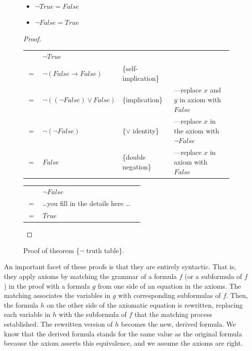\begin{figure}
\begin{theorem}
\mbox{}\\
\begin{itemize}
\item $\neg True = False$
\item $\neg False = True$
\end{itemize}
\end{theorem}
\begin{proof}
\mbox{} \\
\begin{tabular}{llll}
    & $\neg True$                      & \\
$=$ & $\neg (False \rightarrow False)$ & \{self-implication\} \\
$=$ & $\neg ((\neg False) \vee False)$ & \{implication\}     &---replace $x$ and $y$ in axiom with $False$ \\
$=$ & $\neg (\neg False)$              & \{$\vee$ identity\} &---replace $x$ in the axiom with $\neg False$ \\
$=$ & $False$                          & \{double negation\} &---replace $x$ in axiom with $False$ \\
\end{tabular}

\bigskip
\noindent
\begin{tabular}{lll}
    & $\neg False$                             & \\
$=$ & \dots you fill in the details here \dots & \\
$=$ & $True$                                   & \\
\end{tabular}

\end{proof}
\caption{Proof of theorem \{$\neg$ truth table\}.}
\label{fig:neg-truth-table}
\end{figure}

An important facet of these proofs is that they are
entirely syntactic. That is, they apply axioms by
matching the grammar of a formula $f$ (or a subformula of $f$) in the proof
with a formula $g$ from one side of an equation in the axioms.
The matching associates the variables in $g$ with corresponding subformulas of $f$.
Then, the formula $h$ on the other side of
the axiomatic equation is rewritten,
replacing each variable in $h$ with the subformula of $f$
that the matching process established.
The rewritten version of $h$
becomes the new, derived formula.
We know that the derived formula stands for the same value
as the original formula because the axiom asserts this equivalence,
and we assume the axioms are right.

